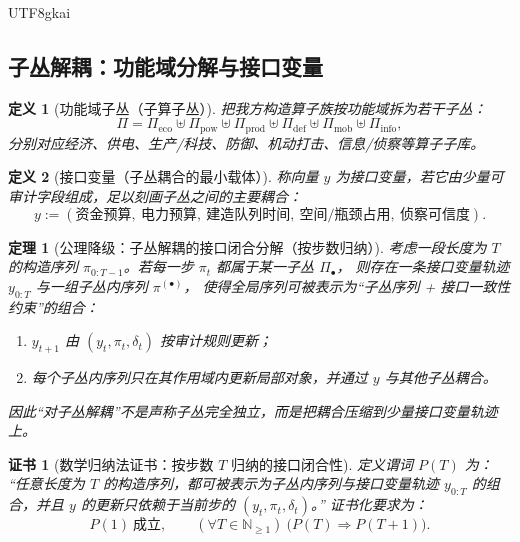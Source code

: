 \documentclass[12pt]{article}
\newtheorem{definition}{定义}[section]
\newtheorem{theorem}{定理}[section]
\newtheorem{Certificate}{证书}[section]
\newcommand{\NN}{\mathbb{N}}
\begin{document}
\begin{CJK*}{UTF8}{gkai}
\subsection{子丛解耦：功能域分解与接口变量}
\label{sec:openra-subbundle-decoupling}

\begin{definition}[功能域子丛（子算子丛）]
把我方构造算子族按功能域拆为若干子丛：
\[
  \Pi
  =
  \Pi_{\mathrm{eco}}
  \uplus
  \Pi_{\mathrm{pow}}
  \uplus
  \Pi_{\mathrm{prod}}
  \uplus
  \Pi_{\mathrm{def}}
  \uplus
  \Pi_{\mathrm{mob}}
  \uplus
  \Pi_{\mathrm{info}},
\]
分别对应经济、供电、生产/科技、防御、机动打击、信息/侦察等算子子库。
\end{definition}

\begin{definition}[接口变量（子丛耦合的最小载体）]
称向量 $y$ 为接口变量，若它由少量可审计字段组成，足以刻画子丛之间的主要耦合：
\[
  y := (\text{资金预算},\ \text{电力预算},\ \text{建造队列时间},\ \text{空间/瓶颈占用},\ \text{侦察可信度}).
\]
\end{definition}

\begin{theorem}[公理降级：子丛解耦的接口闭合分解（按步数归纳）]
\label{thm:openra-subbundle-interface-decomposition}
考虑一段长度为 $T$ 的构造序列 $\pi_{0:T-1}$。若每一步 $\pi_t$ 都属于某一子丛 $\Pi_\bullet$，
则存在一条接口变量轨迹 $y_{0:T}$ 与一组子丛内序列 $\pi^{(\bullet)}$，
使得全局序列可被表示为“子丛序列 + 接口一致性约束”的组合：
\begin{enumerate}
  \item $y_{t+1}$ 由 $(y_t,\pi_t,\delta_t)$ 按审计规则更新；
  \item 每个子丛内序列只在其作用域内更新局部对象，并通过 $y$ 与其他子丛耦合。
\end{enumerate}
因此“对子丛解耦”不是声称子丛完全独立，而是把耦合压缩到少量接口变量轨迹上。
\end{theorem}

\begin{Certificate}[数学归纳法证书：按步数 $T$ 归纳的接口闭合性]
\label{cert:openra-subbundle-interface-decomposition}
定义谓词 $P(T)$ 为：
“任意长度为 $T$ 的构造序列，都可被表示为子丛内序列与接口变量轨迹 $y_{0:T}$ 的组合，并且 $y$ 的更新只依赖于当前步的 $(y_t,\pi_t,\delta_t)$。”
证书化要求为：
\[
  P(1)\ \text{成立},\qquad
  (\forall T\in\NN_{\ge 1})\ \bigl(P(T)\Rightarrow P(T+1)\bigr).
\]
\end{Certificate}


\end{CJK*}
\end{document}
